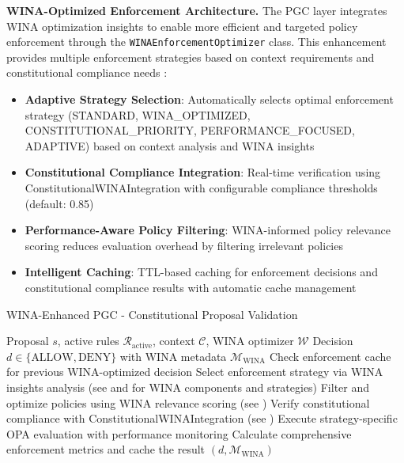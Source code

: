 \documentclass[manuscript,screen,review,anonymous,9pt]{acmart}
\begin{document}
\textbf{WINA-Optimized Enforcement Architecture.} The PGC layer integrates WINA optimization insights \cite{WINA2024NeuronActivation} to enable more efficient and targeted policy enforcement through the \texttt{WINAEnforcementOptimizer} class. This enhancement provides multiple enforcement strategies based on context requirements and constitutional compliance needs \cite{PolicyEnforcementOptimization2024}:

\begin{itemize}
	\item \textbf{Adaptive Strategy Selection}: Automatically selects optimal enforcement strategy (STANDARD, WINA\_OPTIMIZED, CONSTITUTIONAL\_PRIORITY, PERFORMANCE\_FOCUSED, ADAPTIVE) based on context analysis and WINA insights
	\item \textbf{Constitutional Compliance Integration}: Real-time verification using ConstitutionalWINAIntegration with configurable compliance thresholds (default: 0.85) \cite{ConstitutionalCompliance2024}
	\item \textbf{Performance-Aware Policy Filtering}: WINA-informed policy relevance scoring reduces evaluation overhead by filtering irrelevant policies
	\item \textbf{Intelligent Caching}: TTL-based caching for enforcement decisions and constitutional compliance results with automatic cache management \cite{IntelligentCaching2024}
\end{itemize}

\begin{algorithm}[!htbp]
	\caption{WINA-Enhanced PGC - Constitutional Proposal Validation}
	\label{alg:wina_pgc_validation}
	\begin{algorithmic}[1]
		\Require Proposal $s$, active rules $\mathcal{R}_{\text{active}}$, context $\mathcal{C}$, WINA optimizer $\mathcal{W}$
		\Ensure Decision $d \in \{\text{ALLOW}, \text{DENY}\}$ with WINA metadata $\mathcal{M}_{\text{WINA}}$
		\State Check enforcement cache for previous WINA-optimized decision
		\State Select enforcement strategy via WINA insights analysis (see  and  for WINA components and strategies)
		\State Filter and optimize policies using WINA relevance scoring (see )
		\State Verify constitutional compliance with ConstitutionalWINAIntegration (see )
		\State Execute strategy-specific OPA evaluation with performance monitoring
		\State Calculate comprehensive enforcement metrics and cache the result
		\State \Return $(d, \mathcal{M}_{\text{WINA}})$
		\EndFunction
	\end{algorithmic}
\end{algorithm}
\end{document}
